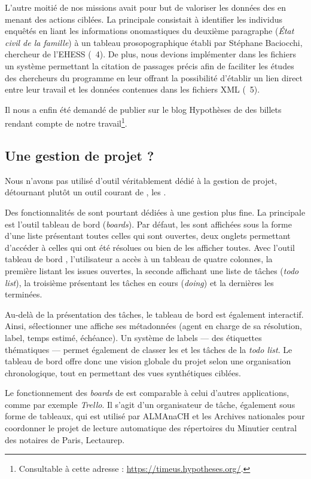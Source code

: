 L'autre moitié de nos missions avait pour but de valoriser les données des \odm{} en menant des actions ciblées. La principale consistait à identifier les individus enquêtés en liant les informations onomastiques du deuxième paragraphe (\textit{État civil de la famille}) à un tableau prosopographique établi par Stéphane Baciocchi, chercheur de l'EHESS (\issue{}~4). De plus, nous devions implémenter dans les fichiers un système permettant la citation de passages précis afin de faciliter les études des chercheurs du programme en leur offrant la possibilité d'établir un lien direct entre leur travail et les données contenues dans les fichiers XML (\issue{}~5).

Il nous a enfin été demandé de publier sur le blog Hypothèses de \timeus{} des billets rendant compte de notre travail\footnote{Consultable à cette adresse : \url{https://timeus.hypotheses.org/}.}.

\subsection{Une gestion de projet ?}

Nous n'avons pas utilisé d'outil véritablement dédié à la gestion de projet, détournant plutôt un outil courant de \gitlab, les \issues.

Des fonctionnalités de \gitlab{} sont pourtant dédiées à une gestion plus fine. La principale est l'outil \og tableau de bord \fg{} (\textit{boards}). Par défaut, les \issues{} sont affichées sous la forme d'une liste présentant toutes celles qui sont ouvertes, deux onglets permettant d'accéder à celles qui ont été résolues ou bien de les afficher toutes. Avec l'outil \og tableau de bord \fg{}, l'utilisateur a accès à un tableau de quatre colonnes, la première listant les issues ouvertes, la seconde affichant une liste de tâches (\textit{todo list}), la troisième présentant les tâches en cours (\textit{doing}) et la dernières les \issues{} terminées.

Au-delà de la présentation des tâches, le tableau de bord est également interactif. Ainsi, sélectionner une \issue{} affiche ses métadonnées (agent en charge de sa résolution, label, temps estimé, échéance). Un système de labels --- des étiquettes thématiques --- permet également de classer les \issues{} et les tâches de la \textit{todo list}. Le tableau de bord offre donc une vision globale du projet selon une organisation chronologique, tout en permettant des vues synthétiques ciblées.

Le fonctionnement des \textit{boards} de \gitlab{} est comparable à celui d'autres applications, comme par exemple \textit{Trello}. Il s'agit d'un organisateur de tâche, également sous forme de tableaux, qui est utilisé par ALMAnaCH et les Archives nationales pour coordonner le projet de lecture automatique des répertoires du Minutier central des notaires de Paris, Lectaurep.

